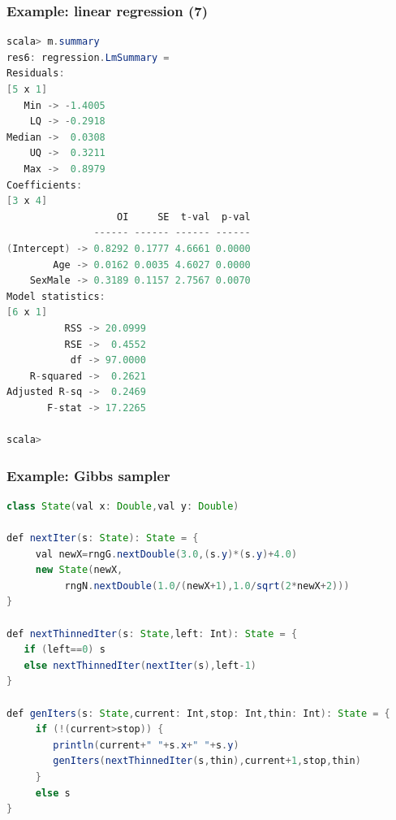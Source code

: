 \documentclass[mathserif,handout]{beamer}
\begin{document}


\begin{frame}[fragile]
\frametitle{Example: linear regression (7)}
{\scriptsize
\begin{lstlisting}[language=java]
scala> m.summary
res6: regression.LmSummary =
Residuals:
[5 x 1]
   Min -> -1.4005
    LQ -> -0.2918
Median ->  0.0308
    UQ ->  0.3211
   Max ->  0.8979
Coefficients:
[3 x 4]
                   OI     SE  t-val  p-val
               ------ ------ ------ ------
(Intercept) -> 0.8292 0.1777 4.6661 0.0000
        Age -> 0.0162 0.0035 4.6027 0.0000
    SexMale -> 0.3189 0.1157 2.7567 0.0070
Model statistics:
[6 x 1]
          RSS -> 20.0999
          RSE ->  0.4552
           df -> 97.0000
    R-squared ->  0.2621
Adjusted R-sq ->  0.2469
       F-stat -> 17.2265

scala> 
\end{lstlisting}
}
\end{frame}


\begin{frame}[fragile]
\frametitle{Example: Gibbs sampler}
{\scriptsize
\begin{lstlisting}[language=java]
class State(val x: Double,val y: Double)
 
def nextIter(s: State): State = {
     val newX=rngG.nextDouble(3.0,(s.y)*(s.y)+4.0)
     new State(newX, 
          rngN.nextDouble(1.0/(newX+1),1.0/sqrt(2*newX+2)))
}
 
def nextThinnedIter(s: State,left: Int): State = {
   if (left==0) s 
   else nextThinnedIter(nextIter(s),left-1)
}
 
def genIters(s: State,current: Int,stop: Int,thin: Int): State = {
     if (!(current>stop)) {
        println(current+" "+s.x+" "+s.y)
        genIters(nextThinnedIter(s,thin),current+1,stop,thin)
     }
     else s
}
\end{lstlisting}
}
\end{frame}
\end{document}

